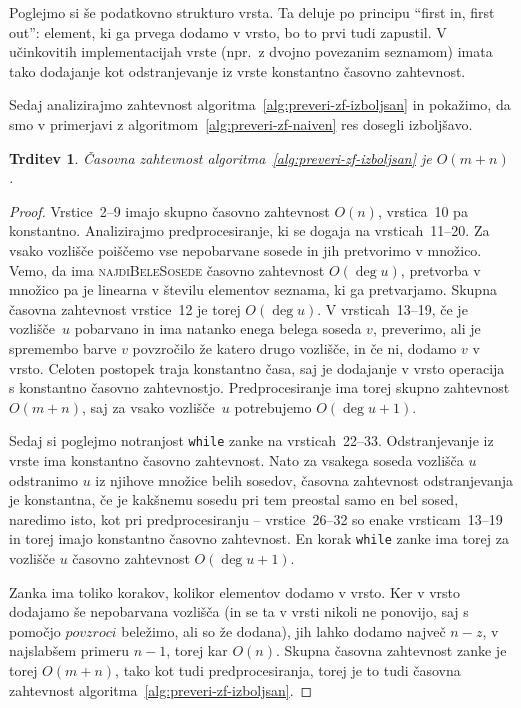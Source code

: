 \documentclass[12pt,a4paper,twoside]{article}
\theoremstyle{definition} %
\theoremstyle{plain} %
\newtheorem{trditev}[definicija]{Trditev}
\numberwithin{equation}{section}  %
\begin{document}
Poglejmo si še podatkovno strukturo vrsta. Ta deluje po principu ``first in, first out'': element, ki ga prvega dodamo v vrsto, bo to prvi tudi zapustil. V učinkovitih implementacijah vrste (npr.~z dvojno povezanim seznamom) imata tako dodajanje kot odstranjevanje iz vrste konstantno časovno zahtevnost.

Sedaj analizirajmo zahtevnost algoritma~\ref{alg:preveri-zf-izboljsan} in pokažimo, da smo v primerjavi z algoritmom~\ref{alg:preveri-zf-naiven} res dosegli izboljšavo.
\begin{trditev}
    Časovna zahtevnost algoritma~\ref{alg:preveri-zf-izboljsan} je $O(m+n)$.
\end{trditev}
\begin{proof}
    Vrstice~2--9 imajo skupno časovno zahtevnost $O(n)$, vrstica~10 pa konstantno. Analizirajmo predprocesiranje, ki se dogaja na vrsticah~11--20. Za vsako vozlišče poiščemo vse nepobarvane sosede in jih pretvorimo v množico. Vemo, da ima \textsc{najdiBeleSosede} časovno zahtevnost $O(\deg u)$, pretvorba v množico pa je linearna v številu elementov seznama, ki ga pretvarjamo. Skupna časovna zahtevnost vrstice~12 je torej $O(\deg u)$. V vrsticah~13--19, če je vozlišče~$u$ pobarvano in ima natanko enega belega soseda $v$, preverimo, ali je spremembo barve $v$ povzročilo že katero drugo vozlišče, in če ni, dodamo $v$ v vrsto. Celoten postopek traja konstantno časa, saj je dodajanje v vrsto operacija s konstantno časovno zahtevnostjo.
    Predprocesiranje ima torej skupno zahtevnost $O(m+n)$, saj za vsako vozlišče~$u$ potrebujemo $O(\deg u + 1)$.
    
    Sedaj si poglejmo notranjost \texttt{while} zanke na vrsticah~22--33. Odstranjevanje iz vrste ima konstantno časovno zahtevnost. Nato za vsakega soseda vozlišča $u$ odstranimo $u$ iz njihove množice belih sosedov, časovna zahtevnost odstranjevanja je konstantna, če je kakšnemu sosedu pri tem preostal samo en bel sosed, naredimo isto, kot pri predprocesiranju -- vrstice~26--32 so enake vrsticam~13--19 in torej imajo konstantno časovno zahtevnost. En korak \texttt{while} zanke ima torej za vozlišče $u$ časovno zahtevnost $O(\deg u + 1)$.
    
    Zanka ima toliko korakov, kolikor elementov dodamo v vrsto. Ker v vrsto dodajamo še nepobarvana vozlišča (in se ta v vrsti nikoli ne ponovijo, saj s pomočjo $povzroci$ beležimo, ali so že dodana), jih lahko dodamo največ $n-z$, v najslabšem primeru $n-1$, torej kar $O(n)$. Skupna časovna zahtevnost zanke je torej $O(m+n)$, tako kot tudi predprocesiranja, torej je to tudi časovna zahtevnost algoritma~\ref{alg:preveri-zf-izboljsan}.
\end{proof}
\end{document}
